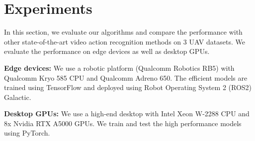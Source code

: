 \documentclass[letterpaper, 10 pt, conference]{ieeeconf}
\begin{document}
 \section{Experiments}
\label{sec: experiment}



In this section, we evaluate our algorithms and compare the performance with other state-of-the-art video action recognition methods on 3 UAV datasets. We evaluate the performance on edge devices as well as desktop GPUs.

\noindent  \textbf{Edge devices:} We use a robotic platform (Qualcomm Robotics RB5) with Qualcomm Kryo 585 CPU and Qualcomm Adreno 650. The efficient models are trained using TensorFlow and deployed using Robot Operating System 2 (ROS2) Galactic.

\noindent  \textbf{Desktop GPUs:} We use a high-end desktop with Intel Xeon W-2288 CPU and 8x Nvidia RTX A5000 GPUs. We train and test the high performance models using PyTorch.
\end{document}
